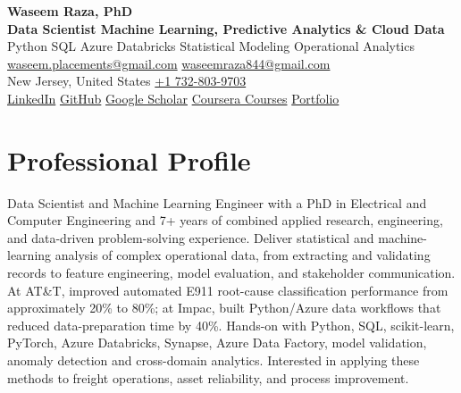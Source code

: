 \documentclass[9pt,letterpaper]{extarticle}
\begin{document}
\begin{center}
{\LARGE\bfseries Waseem Raza, PhD}{\normalsize\mdseries }\\[2pt]
{\large\bfseries Data Scientist \textbar{} Machine Learning, Predictive Analytics \& Cloud Data}\\[1pt]
{\small Python \textbar{} SQL \textbar{} Azure Databricks \textbar{} Statistical Modeling \textbar{} Operational Analytics}\\[3pt]
{\footnotesize {}\enspace \href{mailto:waseem.placements@gmail.com}{waseem.placements@gmail.com} \textbar{} \href{mailto:waseemraza844@gmail.com}{waseemraza844@gmail.com}\\[1pt]New Jersey, United States \quad {}\enspace \href{tel:+17328039703}{+1 732-803-9703}\\[1pt]\href{https://www.linkedin.com/in/waseem-raza-phd-9a737858/}{LinkedIn} \textbar{} \href{https://github.com/WaseemRaza844}{GitHub} \textbar{} \href{https://scholar.google.com/citations?user=d58Drr0AAAAJ\&hl=en}{Google Scholar} \textbar{} \href{https://waseemraza844.github.io/portfolio/learning.html}{Coursera Courses} \textbar{} \href{https://waseemraza844.github.io/portfolio/}{Portfolio}}
\end{center}
\vspace{-5pt}
\section{Professional Profile}
Data Scientist and Machine Learning Engineer with a PhD in Electrical and Computer Engineering and 7+ years of combined applied research, engineering, and data-driven problem-solving experience. Deliver statistical and machine-learning analysis of complex operational data, from extracting and validating records to feature engineering, model evaluation, and stakeholder communication. At AT\&T, improved automated E911 root-cause classification performance from approximately 20\% to 80\%; at Impac, built Python/Azure data workflows that reduced data-preparation time by 40\%. Hands-on with Python, SQL, scikit-learn, PyTorch, Azure Databricks, Synapse, Azure Data Factory, model validation, anomaly detection and cross-domain analytics. Interested in applying these methods to freight operations, asset reliability, and process improvement.
\end{document}

